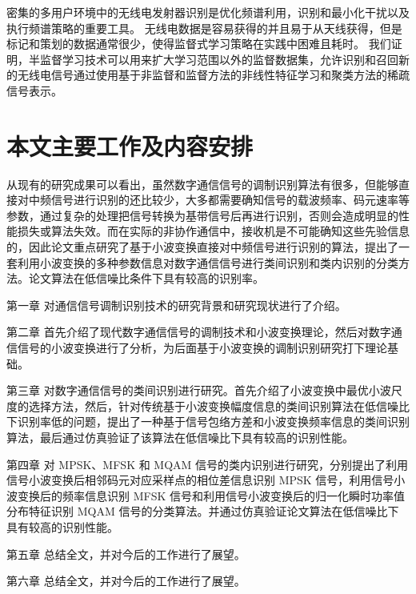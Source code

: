 密集的多用户环境中的无线电发射器识别是优化频谱利用，识别和最小化干扰以及执行频谱策略的重要工具。 无线电数据是容易获得的并且易于从天线获得，但是标记和策划的数据通常很少，使得监督式学习策略在实践中困难且耗时。 我们证明，半监督学习技术可以用来扩大学习范围以外的监督数据集，允许识别和召回新的无线电信号通过使用基于非监督和监督方法的非线性特征学习和聚类方法的稀疏信号表示。\par


\section{本文主要工作及内容安排}
从现有的研究成果可以看出，虽然数字通信信号的调制识别算法有很多，但能够直接对中频信号进行识别的还比较少，大多都需要确知信号的载波频率、码元速率等参数，通过复杂的处理把信号转换为基带信号后再进行识别，否则会造成明显的性能损失或算法失效。而在实际的非协作通信中，接收机是不可能确知这些先验信息的，因此论文重点研究了基于小波变换直接对中频信号进行识别的算法，提出了一套利用小波变换的多种参数信息对数字通信信号进行类间识别和类内识别的分类方法。论文算法在低信噪比条件下具有较高的识别率。 \par

第一章 对通信信号调制识别技术的研究背景和研究现状进行了介绍。\par

第二章 首先介绍了现代数字通信信号的调制技术和小波变换理论，然后对数字通信信号的小波变换进行了分析，为后面基于小波变换的调制识别研究打下理论基础。 \par

第三章 对数字通信信号的类间识别进行研究。首先介绍了小波变换中最优小波尺度的选择方法，然后，针对传统基于小波变换幅度信息的类间识别算法在低信噪比下识别率低的问题，提出了一种基于信号包络方差和小波变换频率信息的类间识别算法，最后通过仿真验证了该算法在低信噪比下具有较高的识别性能。 \par

第四章 对 MPSK、MFSK 和 MQAM 信号的类内识别进行研究，分别提出了利用信号小波变换后相邻码元对应采样点的相位差信息识别 MPSK 信号，利用信号小波变换后的频率信息识别 MFSK 信号和利用信号小波变换后的归一化瞬时功率值分布特征识别 MQAM 信号的分类算法。并通过仿真验证论文算法在低信噪比下具有较高的识别性能。 \par

第五章 总结全文，并对今后的工作进行了展望。\par

第六章 总结全文，并对今后的工作进行了展望。\par
